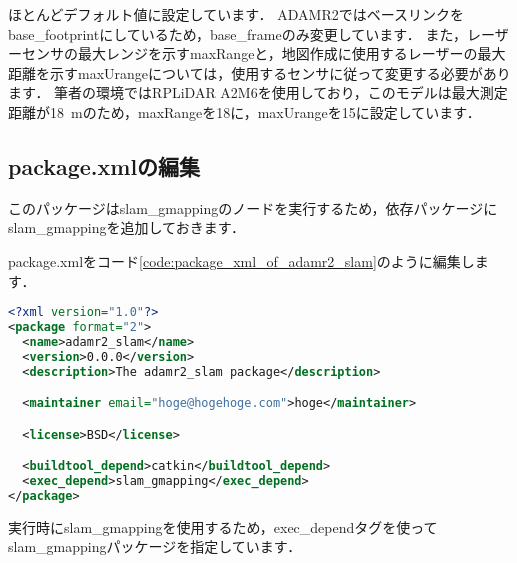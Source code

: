 \documentclass[{../../master}]{subfiles}
\begin{document}
ほとんどデフォルト値に設定しています．
ADAMR2ではベースリンクを\textsf{base\_footprint}にしているため，\textsf{base\_frame}のみ変更しています．
また，レーザーセンサの最大レンジを示す\textsf{maxRange}と，地図作成に使用するレーザーの最大距離を示す\textsf{maxUrange}については，使用するセンサに従って変更する必要があります．
筆者の環境ではRPLiDAR A2M6を使用しており，このモデルは最大測定距離が\SI{18}{m}のため，\textsf{maxRange}を18に，\textsf{maxUrange}を15に設定しています．

\subsection{\textsf{package.xml}の編集}

このパッケージは\textsf{slam\_gmapping}のノードを実行するため，依存パッケージに\textsf{slam\_gmapping}を追加しておきます．

\textsf{package.xml}をコード\ref{code:package_xml_of_adamr2_slam}のように編集します．

\begin{lstlisting}[language=XML, label=code:package_xml_of_adamr2_slam, caption=\textsf{package.xml}]
<?xml version="1.0"?>
<package format="2">
  <name>adamr2_slam</name>
  <version>0.0.0</version>
  <description>The adamr2_slam package</description>

  <maintainer email="hoge@hogehoge.com">hoge</maintainer>

  <license>BSD</license>

  <buildtool_depend>catkin</buildtool_depend>
  <exec_depend>slam_gmapping</exec_depend>
</package>
\end{lstlisting}

実行時に\textsf{slam\_gmapping}を使用するため，\textsf{exec\_depend}タグを使って\textsf{slam\_gmapping}パッケージを指定しています．
\end{document}
